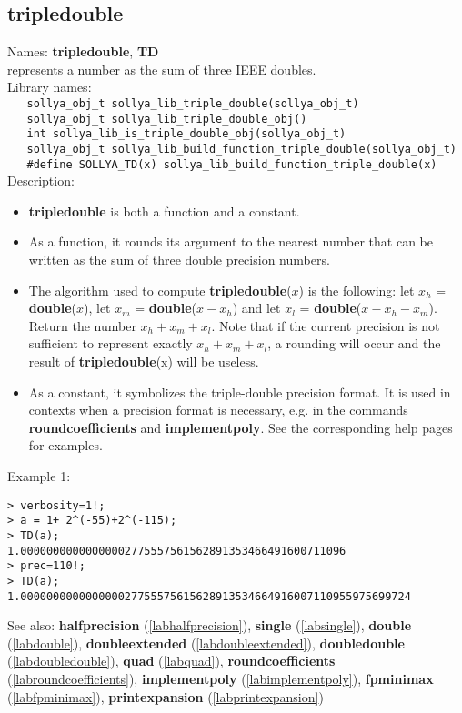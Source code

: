 \subsection{tripledouble}
\label{labtripledouble}
\noindent Names: \textbf{tripledouble}, \textbf{TD}\\
\phantom{aaa}represents a number as the sum of three IEEE doubles.\\[0.2cm]
\noindent Library names:\\
\verb|   sollya_obj_t sollya_lib_triple_double(sollya_obj_t)|\\
\verb|   sollya_obj_t sollya_lib_triple_double_obj()|\\
\verb|   int sollya_lib_is_triple_double_obj(sollya_obj_t)|\\
\verb|   sollya_obj_t sollya_lib_build_function_triple_double(sollya_obj_t)|\\
\verb|   #define SOLLYA_TD(x) sollya_lib_build_function_triple_double(x)|\\[0.2cm]
\noindent Description: \begin{itemize}

\item \textbf{tripledouble} is both a function and a constant.

\item As a function, it rounds its argument to the nearest number that can be written
   as the sum of three double precision numbers.

\item The algorithm used to compute \textbf{tripledouble}($x$) is the following: let $x_h$ = \textbf{double}($x$),
   let $x_m$ = \textbf{double}($x-x_h$) and let $x_l$ = \textbf{double}($x-x_h-x_m$). 
   Return the number $x_h+x_m+x_l$. Note that if the
   current precision is not sufficient to represent exactly $x_h+x_m+x_l$, a rounding will
   occur and the result of \textbf{tripledouble}(x) will be useless.

\item As a constant, it symbolizes the triple-double precision format. It is used in 
   contexts when a precision format is necessary, e.g. in the commands 
   \textbf{roundcoefficients} and \textbf{implementpoly}.
   See the corresponding help pages for examples.
\end{itemize}
\noindent Example 1: 
\begin{center}\begin{minipage}{15cm}\begin{Verbatim}[frame=single]
> verbosity=1!;
> a = 1+ 2^(-55)+2^(-115);
> TD(a);
1.00000000000000002775557561562891353466491600711096
> prec=110!;
> TD(a);
1.000000000000000027755575615628913534664916007110955975699724
\end{Verbatim}
\end{minipage}\end{center}
See also: \textbf{halfprecision} (\ref{labhalfprecision}), \textbf{single} (\ref{labsingle}), \textbf{double} (\ref{labdouble}), \textbf{doubleextended} (\ref{labdoubleextended}), \textbf{doubledouble} (\ref{labdoubledouble}), \textbf{quad} (\ref{labquad}), \textbf{roundcoefficients} (\ref{labroundcoefficients}), \textbf{implementpoly} (\ref{labimplementpoly}), \textbf{fpminimax} (\ref{labfpminimax}), \textbf{printexpansion} (\ref{labprintexpansion})
